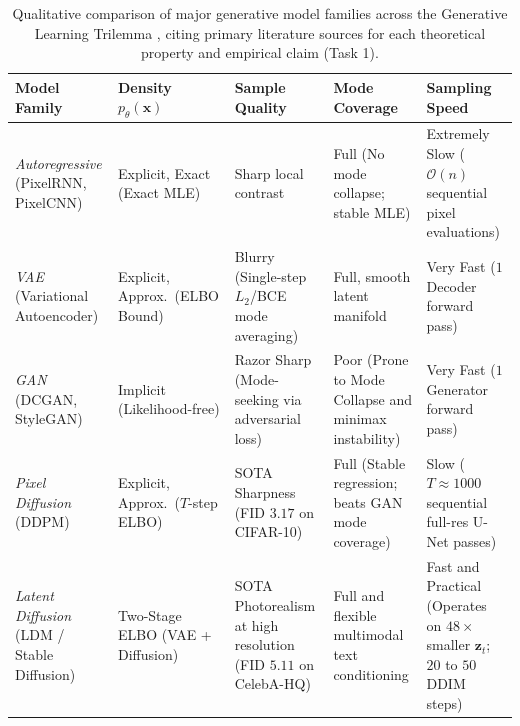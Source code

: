 \documentclass[10pt,a4paper]{article}
\begin{document}
\begin{table}[htbp]
\centering
\caption{Qualitative comparison of major generative model families across the Generative Learning Trilemma \cite{xiao2022tackling}, citing primary literature sources for each theoretical property and empirical claim (Task 1).}
\label{tab:task1_paradigms}
\footnotesize
\begin{tabularx}{\textwidth}{>{\raggedright\arraybackslash}p{2.7cm} >{\raggedright\arraybackslash}p{2.4cm} >{\raggedright\arraybackslash}X >{\raggedright\arraybackslash}X >{\raggedright\arraybackslash}p{2.9cm}}
\toprule
Model Family & Density $p_\theta(\mathbf{x})$ & Sample Quality & Mode Coverage & Sampling Speed \\
\midrule
\textit{Autoregressive} \cite{oord2016pixel, salimans2017pixelcnn} (PixelRNN, PixelCNN) & Explicit, Exact (Exact MLE) \cite{oord2016pixel, salimans2017pixelcnn} & Sharp local contrast \cite{oord2016pixel, xiao2022tackling} & Full (No mode collapse; stable MLE) \cite{oord2016pixel, ho2020denoising} & Extremely Slow ($\mathcal{O}(n)$ sequential pixel evaluations) \cite{oord2016pixel, song2021denoising, xiao2022tackling} \\
\addlinespace[0.3em]
\textit{VAE} \cite{kingma2014auto} (Variational Autoencoder) & Explicit, Approx.\ (ELBO Bound) \cite{kingma2014auto} & Blurry (Single-step $L_2$/BCE mode averaging) \cite{kingma2014auto, theis2016note, xiao2022tackling} & Full, smooth latent manifold \cite{kingma2014auto, xiao2022tackling} & Very Fast ($1$ Decoder forward pass) \cite{kingma2014auto, xiao2022tackling} \\
\addlinespace[0.3em]
\textit{GAN} \cite{goodfellow2014generative, radford2016unsupervised} (DCGAN, StyleGAN) & Implicit (Likelihood-free) \cite{goodfellow2014generative} & Razor Sharp (Mode-seeking via adversarial loss) \cite{goodfellow2014generative, brock2018large, xiao2022tackling} & Poor (Prone to Mode Collapse and minimax instability) \cite{goodfellow2014generative, arjovsky2017wasserstein, xiao2022tackling} & Very Fast ($1$ Generator forward pass) \cite{goodfellow2014generative, xiao2022tackling} \\
\addlinespace[0.3em]
\textit{Pixel Diffusion} \cite{sohl2015deep, ho2020denoising} (DDPM) & Explicit, Approx.\ ($T$-step ELBO) \cite{sohl2015deep, ho2020denoising} & SOTA Sharpness (FID $3.17$ on CIFAR-10) \cite{ho2020denoising, dhariwal2021diffusion} & Full (Stable regression; beats GAN mode coverage) \cite{ho2020denoising, dhariwal2021diffusion, xiao2022tackling} & Slow ($T \approx 1000$ sequential full-res U-Net passes) \cite{ho2020denoising, song2021denoising, xiao2022tackling} \\
\addlinespace[0.3em]
\textit{Latent Diffusion} \cite{rombach2022high} (LDM / Stable Diffusion) & Two-Stage ELBO (VAE + Diffusion) \cite{rombach2022high} & SOTA Photorealism at high resolution (FID $5.11$ on CelebA-HQ) \cite{rombach2022high} & Full and flexible multimodal text conditioning \cite{rombach2022high} & Fast and Practical (Operates on $48\times$ smaller $\mathbf{z}_t$; $20$ to $50$ DDIM steps) \cite{rombach2022high, song2021denoising} \\
\bottomrule
\end{tabularx}
\end{table}
\end{document}
